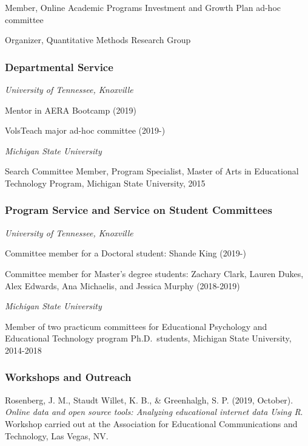 \documentclass[14,]{article}
\begin{document}
Member, Online Academic Programs Investment and Growth Plan ad-hoc
committee

Organizer, Quantitative Methods Research Group

\hypertarget{departmental-service}{%
\subsubsection{Departmental Service}\label{departmental-service}}

\emph{University of Tennessee, Knoxville}

Mentor in AERA Bootcamp (2019)

VolsTeach major ad-hoc committee (2019-)

\emph{Michigan State University}

Search Committee Member, Program Specialist, Master of Arts in
Educational Technology Program, Michigan State University, 2015

\hypertarget{program-service-and-service-on-student-committees}{%
\subsubsection{Program Service and Service on Student
Committees}\label{program-service-and-service-on-student-committees}}

\emph{University of Tennessee, Knoxville}

Committee member for a Doctoral student: Shande King (2019-)

Committee member for Master's degree students: Zachary Clark, Lauren
Dukes, Alex Edwards, Ana Michaelis, and Jessica Murphy (2018-2019)

\emph{Michigan State University}

Member of two practicum committees for Educational Psychology and
Educational Technology program Ph.D.~students, Michigan State
University, 2014-2018

\hypertarget{workshops-and-outreach}{%
\subsubsection{Workshops and Outreach}\label{workshops-and-outreach}}

Rosenberg, J. M., Staudt Willet, K. B., \& Greenhalgh, S. P. (2019,
October). \emph{Online data and open source tools: Analyzing educational
internet data Using R}. Workshop carried out at the Association for
Educational Communications and Technology, Las Vegas, NV.
\end{document}
